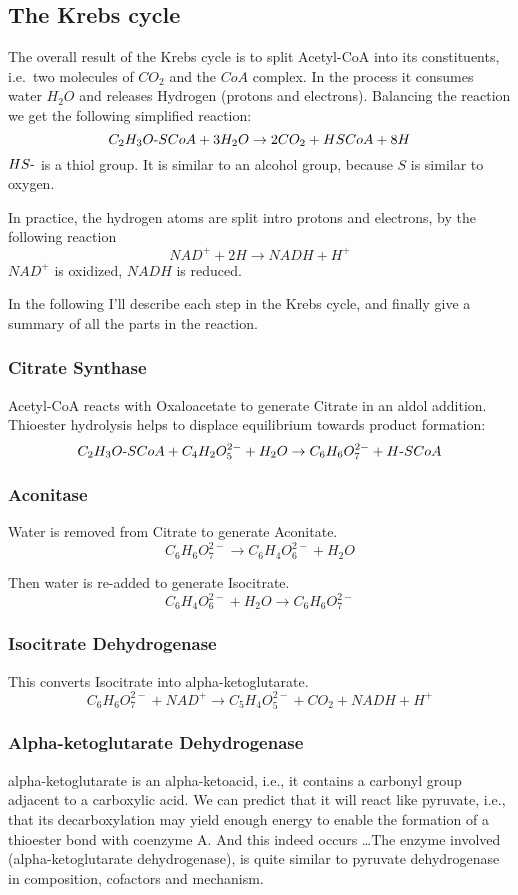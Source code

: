 \documentclass{article}
\def\mhyphen{{\hbox{-}}}
\begin{document}
\subsection{The Krebs cycle}
The overall result of the Krebs cycle is to split Acetyl-CoA into its constituents, i.e.\
two molecules of $CO_2$ and the $CoA$ complex. In the process it consumes water $H_2O$ and
releases Hydrogen (protons and electrons). Balancing the reaction we get the following
simplified reaction:
\[
    C_2H_3O{\mhyphen}SCoA + 3H_2O \rightarrow 2CO_2 + HSCoA + 8H
\]
$HS{\mhyphen}$ is a thiol group. It is similar to an alcohol group, because $S$ is similar to
oxygen.

In practice, the hydrogen atoms are split intro protons and electrons, by the following
reaction
\[
    NAD^+ + 2H \rightarrow NADH + H^+
\]
$NAD^+$ is oxidized, $NADH$ is reduced.

In the following I'll describe each step in the Krebs cycle, and finally give a summary of
all the parts in the reaction.

\subsubsection{Citrate Synthase}
Acetyl-CoA reacts with Oxaloacetate to generate Citrate in an aldol addition.
Thioester hydrolysis helps to displace equilibrium towards product formation:
\[
    C_2H_3O{\mhyphen}SCoA + C_4H_2O_5^{2-} + H_2O \rightarrow
    C_6H_6O_7^{2-} + H{\mhyphen}SCoA
\]

\subsubsection{Aconitase}
Water is removed from Citrate to generate Aconitate.
\[
    C_6H_6O_7^{2-} \rightarrow C_6H_4O_6^{2-} + H_2O
\]

Then water is re-added to generate Isocitrate.
\[
    C_6H_4O_6^{2-} + H_2O \rightarrow C_6H_6O_7^{2-}
\]

\subsubsection{Isocitrate Dehydrogenase}
This converts Isocitrate into alpha-ketoglutarate.
\[
    C_6H_6O_7^{2-} + NAD^+ \rightarrow C_5H_4O_5^{2-} + CO_2 + NADH + H^+
\]

\subsubsection{Alpha-ketoglutarate Dehydrogenase}
alpha-ketoglutarate is an alpha-ketoacid, i.e., it contains a carbonyl group adjacent to a
carboxylic acid. We can predict that it will react like pyruvate, i.e., that its
decarboxylation may yield enough energy to enable the formation of a thioester bond with
coenzyme A. And this indeed occurs \ldots The enzyme involved (alpha-ketoglutarate dehydrogenase),
is quite similar to pyruvate dehydrogenase in composition, cofactors and mechanism.
\end{document}
